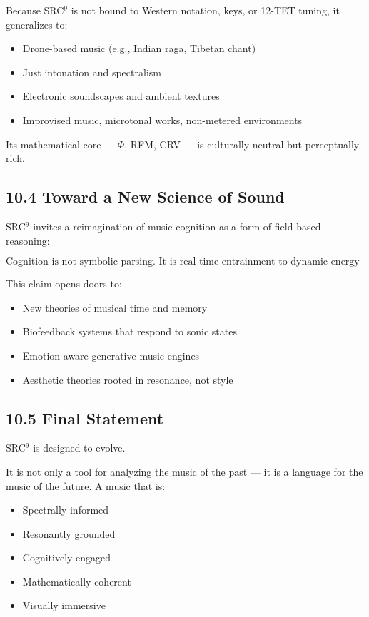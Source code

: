 Because SRC$^{9}$ is not bound to Western notation, keys, or 12-TET tuning, it generalizes to:

\begin{itemize}
    \item Drone-based music (e.g., Indian raga, Tibetan chant)
    \item Just intonation and spectralism
    \item Electronic soundscapes and ambient textures
    \item Improvised music, microtonal works, non-metered environments
\end{itemize}

Its mathematical core — $\Phi$, RFM, CRV — is culturally neutral but perceptually rich.

\subsection*{10.4 Toward a New Science of Sound}

SRC$^{9}$ invites a reimagination of music cognition as a form of field-based reasoning:

\[
\text{Cognition is not symbolic parsing. It is real-time entrainment to dynamic energy structures.}
\]

This claim opens doors to:

\begin{itemize}
    \item New theories of musical time and memory
    \item Biofeedback systems that respond to sonic states
    \item Emotion-aware generative music engines
    \item Aesthetic theories rooted in resonance, not style
\end{itemize}

\subsection*{10.5 Final Statement}

SRC$^{9}$ is designed to evolve.

It is not only a tool for analyzing the music of the past — it is a language for the music of the future. A music that is:

\begin{itemize}
    \item Spectrally informed
    \item Resonantly grounded
    \item Cognitively engaged
    \item Mathematically coherent
    \item Visually immersive
\end{itemize}

